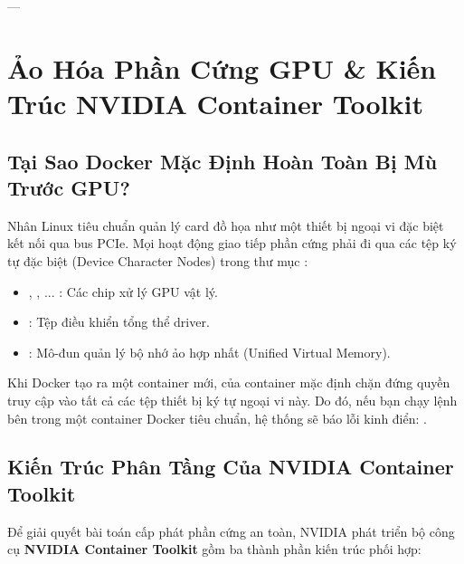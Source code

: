 ---

\section{Ảo Hóa Phần Cứng GPU \& Kiến Trúc NVIDIA Container Toolkit}
\label{sec:gpu-container-virtualization}

\subsection{Tại Sao Docker Mặc Định Hoàn Toàn Bị Mù Trước GPU?}
Nhân Linux tiêu chuẩn quản lý card đồ họa như một thiết bị ngoại vi đặc biệt kết nối qua bus PCIe. Mọi hoạt động giao tiếp phần cứng phải đi qua các tệp ký tự đặc biệt (Device Character Nodes) trong thư mục :
\begin{itemize}
  \item {}, , ... : Các chip xử lý GPU vật lý.
  \item {} : Tệp điều khiển tổng thể driver.
  \item {} : Mô-đun quản lý bộ nhớ ảo hợp nhất (Unified Virtual Memory).
\end{itemize}
Khi Docker tạo ra một container mới,  của container mặc định chặn đứng quyền truy cập vào tất cả các tệp thiết bị ký tự ngoại vi này. Do đó, nếu bạn chạy lệnh  bên trong một container Docker tiêu chuẩn, hệ thống sẽ báo lỗi kinh điển: .

\subsection{Kiến Trúc Phân Tầng Của NVIDIA Container Toolkit}
Để giải quyết bài toán cấp phát phần cứng an toàn, NVIDIA phát triển bộ công cụ \textbf{NVIDIA Container Toolkit} gồm ba thành phần kiến trúc phối hợp:

